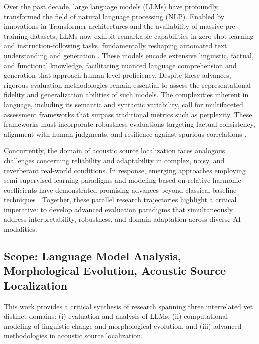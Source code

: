 Over the past decade, large language models (LLMs) have profoundly transformed the field of natural language processing (NLP). Enabled by innovations in Transformer architectures and the availability of massive pre-training datasets, LLMs now exhibit remarkable capabilities in zero-shot learning and instruction-following tasks, fundamentally reshaping automated text understanding and generation \cite{ref10}. These models encode extensive linguistic, factual, and functional knowledge, facilitating nuanced language comprehension and generation that approach human-level proficiency. Despite these advances, rigorous evaluation methodologies remain essential to assess the representational fidelity and generalization abilities of such models. The complexities inherent in language, including its semantic and syntactic variability, call for multifaceted assessment frameworks that surpass traditional metrics such as perplexity. These frameworks must incorporate robustness evaluations targeting factual consistency, alignment with human judgments, and resilience against spurious correlations \cite{ref1}.

Concurrently, the domain of acoustic source localization faces analogous challenges concerning reliability and adaptability in complex, noisy, and reverberant real-world conditions. In response, emerging approaches employing semi-supervised learning paradigms and modeling based on relative harmonic coefficients have demonstrated promising advances beyond classical baseline techniques \cite{ref2,ref3,ref26}. Together, these parallel research trajectories highlight a critical imperative: to develop advanced evaluation paradigms that simultaneously address interpretability, robustness, and domain adaptation across diverse AI modalities.

\subsection{Scope: Language Model Analysis, Morphological Evolution, Acoustic Source Localization}

This work provides a critical synthesis of research spanning three interrelated yet distinct domains: (i) evaluation and analysis of LLMs, (ii) computational modeling of linguistic change and morphological evolution, and (iii) advanced methodologies in acoustic source localization.

